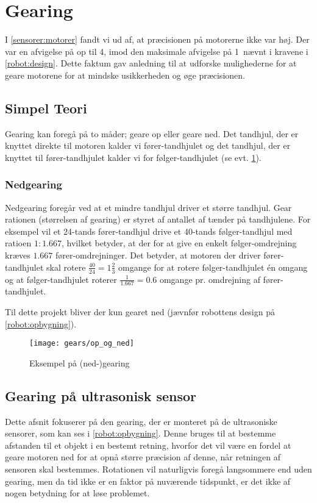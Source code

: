 \section{Gearing}\label{robot:gearing}
I \cref{sensorer:motorer} fandt vi ud af, at præcisionen på motorerne ikke var høj.
Der var en afvigelse på op til 4\dg, imod den maksimale afvigelse på 1\dg ~nævnt i kravene i \cref{robot:design}.
Dette faktum gav anledning til at udforske mulighederne for at geare motorene for at mindske usikkerheden og øge præcisionen.

\subsection{Simpel Teori}\label{gearing:simpel_teori}
Gearing kan foregå på to måder; geare op eller geare ned.
Det tandhjul, der er knyttet direkte til motoren kalder vi fører-tandhjulet og det tandhjul, der er knyttet til fører-tandhjulet kalder vi for følger-tandhjulet (se evt. \cref{gearing:nedgearing}).

\subsubsection{Nedgearing}
Nedgearing foregår ved at et mindre tandhjul driver et større tandhjul.
Gear rationen (størrelsen af gearing) er styret af antallet af tænder på tandhjulene.
For eksempel vil et 24-tands fører-tandhjul drive et 40-tands følger-tandhjul med ratioen $1:1.667$, hvilket betyder, at der for at give en enkelt følger-omdrejning kræves $1.667$ fører-omdrejninger. 
Det betyder, at motoren der driver fører-tandhjulet skal rotere $\frac{40}{24} = 1 \frac{2}{3}$ omgange for at rotere følger-tandhjulet én omgang og at følger-tandhjulet roterer $\frac{1}{1.667} = 0.6$ omgange pr. omdrejning af fører-tandhjulet.

Til dette projekt bliver der kun gearet ned (jævnfør robottens design på \cref{robot:opbygning}).


\begin{figure}[h]
\centering
\texttt{[image: gears/op\_og\_ned]}
\caption{Eksempel på (ned-)gearing}
\label{gearing:nedgearing}
\end{figure}

\subsection{Gearing på ultrasonisk sensor}
Dette afsnit fokuserer på den gearing, der er monteret på de ultrasoniske sensorer, som kan ses i \cref{robot:opbygning}.
Denne bruges til at bestemme afstanden til et objekt i en bestemt retning, hvorfor det vil være en fordel at geare motoren ned for at opnå større præcision af denne, når retningen af sensoren skal bestemmes.
Rotationen vil naturligvis foregå langsommere end uden gearing, men da tid ikke er en faktor på nuværende tidspunkt, er det ikke af nogen betydning for at løse problemet.

